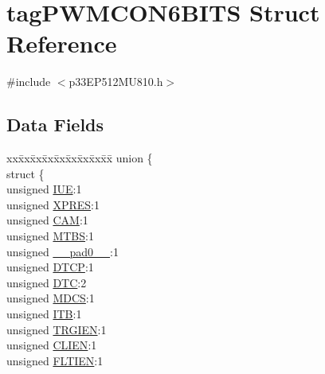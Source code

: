 \hypertarget{structtag_p_w_m_c_o_n6_b_i_t_s}{}\section{tag\+P\+W\+M\+C\+O\+N6\+B\+I\+TS Struct Reference}
\label{structtag_p_w_m_c_o_n6_b_i_t_s}


{\ttfamily \#include $<$p33\+E\+P512\+M\+U810.\+h$>$}

\subsection*{Data Fields}
\begin{DoxyCompactItemize}
\item 
\begin{tabbing}
xx\=xx\=xx\=xx\=xx\=xx\=xx\=xx\=xx\=\kill
union \{\\
\>struct \{\\
\>\>unsigned \hyperlink{structtag_p_w_m_c_o_n6_b_i_t_s_a2b95b61e8c208d0ffdc7441133d3b0a3}{IUE}:1\\
\>\>unsigned \hyperlink{structtag_p_w_m_c_o_n6_b_i_t_s_a6a3f824223966417e0005dbe08b1833c}{XPRES}:1\\
\>\>unsigned \hyperlink{structtag_p_w_m_c_o_n6_b_i_t_s_a912fd2c19cfc2bb7d43e4cb3bae4d0bf}{CAM}:1\\
\>\>unsigned \hyperlink{structtag_p_w_m_c_o_n6_b_i_t_s_ad4b1db357995f4e3ff43d2e6c734159e}{MTBS}:1\\
\>\>unsigned \hyperlink{structtag_p_w_m_c_o_n6_b_i_t_s_adf71f3d8410c1f1dbbc96680a92c49af}{\_\_pad0\_\_}:1\\
\>\>unsigned \hyperlink{structtag_p_w_m_c_o_n6_b_i_t_s_a42fd7808d2a3b328aac343a2c4e781d7}{DTCP}:1\\
\>\>unsigned \hyperlink{structtag_p_w_m_c_o_n6_b_i_t_s_a0ac766a24b648c50040810c3f207926c}{DTC}:2\\
\>\>unsigned \hyperlink{structtag_p_w_m_c_o_n6_b_i_t_s_acb5516c8c2c937478d0e653afdb05254}{MDCS}:1\\
\>\>unsigned \hyperlink{structtag_p_w_m_c_o_n6_b_i_t_s_a5d923b710199bb786b4c9f1d71b104f2}{ITB}:1\\
\>\>unsigned \hyperlink{structtag_p_w_m_c_o_n6_b_i_t_s_a4dd5600256667e48b1fe49e80ef95d33}{TRGIEN}:1\\
\>\>unsigned \hyperlink{structtag_p_w_m_c_o_n6_b_i_t_s_a6536fa9a3ad62ffb7a3ed0a2b1bf6394}{CLIEN}:1\\
\>\>unsigned \hyperlink{structtag_p_w_m_c_o_n6_b_i_t_s_a4d88b1c37d3feefa1055445ffc9a981c}{FLTIEN}:1\\

\end{tabbing}
\end{DoxyCompactItemize}
